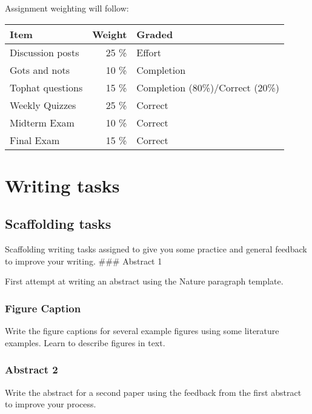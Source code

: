 \documentclass[11pt,]{article}
\begin{document}
Assignment weighting will follow:

\begin{longtable}[]{@{}lrl@{}}
\toprule()
Item & Weight & Graded \\
\midrule()
\endhead
Discussion posts & 25 \% & Effort \\
Gots and nots & 10 \% & Completion \\
Tophat questions & 15 \% & Completion (80\%)/Correct (20\%) \\
Weekly Quizzes & 25 \% & Correct \\
Midterm Exam & 10 \% & Correct \\
Final Exam & 15 \% & Correct \\
\bottomrule()
\end{longtable}

\newpage

\hypertarget{writing-tasks}{%
\section{Writing tasks}\label{writing-tasks}}

\hypertarget{scaffolding-tasks}{%
\subsection{Scaffolding tasks}\label{scaffolding-tasks}}

Scaffolding writing tasks assigned to give you some practice and general
feedback to improve your writing. \#\#\# Abstract 1

First attempt at writing an abstract using the Nature paragraph
template.

\hypertarget{figure-caption}{%
\subsubsection{Figure Caption}\label{figure-caption}}

Write the figure captions for several example figures using some
literature examples. Learn to describe figures in text.

\hypertarget{abstract-2}{%
\subsubsection{Abstract 2}\label{abstract-2}}

Write the abstract for a second paper using the feedback from the first
abstract to improve your process.
\end{document}
